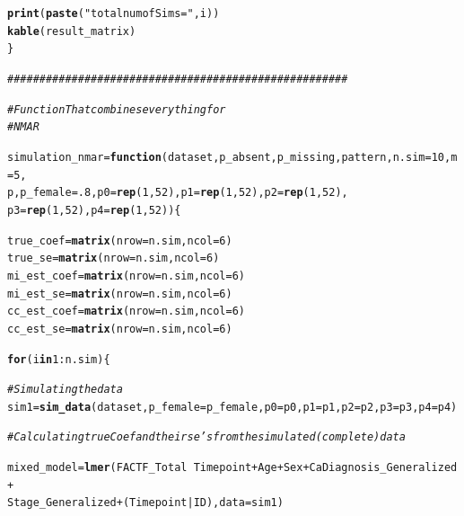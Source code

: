 \documentclass[fleqn,10pt]{wlscirep}\usepackage[]{graphicx}\usepackage[]{color}
\makeatletter
\newcommand{\hlnum}[1]{\textcolor[rgb]{0.686,0.059,0.569}{#1}}%
\newcommand{\hlstr}[1]{\textcolor[rgb]{0.192,0.494,0.8}{#1}}%
\newcommand{\hlcom}[1]{\textcolor[rgb]{0.678,0.584,0.686}{\textit{#1}}}%
\newcommand{\hlopt}[1]{\textcolor[rgb]{0,0,0}{#1}}%
\newcommand{\hlstd}[1]{\textcolor[rgb]{0.345,0.345,0.345}{#1}}%
\newcommand{\hlkwa}[1]{\textcolor[rgb]{0.161,0.373,0.58}{\textbf{#1}}}%
\newcommand{\hlkwb}[1]{\textcolor[rgb]{0.69,0.353,0.396}{#1}}%
\newcommand{\hlkwc}[1]{\textcolor[rgb]{0.333,0.667,0.333}{#1}}%
\newcommand{\hlkwd}[1]{\textcolor[rgb]{0.737,0.353,0.396}{\textbf{#1}}}%
\newenvironment{kframe}{%
 \def\at@end@of@kframe{}%
 \ifinner\ifhmode%
  \def\at@end@of@kframe{\end{minipage}}%
  \begin{minipage}{\columnwidth}%
 \fi\fi%
 \def\FrameCommand##1{\hskip\@totalleftmargin \hskip-\fboxsep
 \colorbox{shadecolor}{##1}\hskip-\fboxsep
     \hskip-\linewidth \hskip-\@totalleftmargin \hskip\columnwidth}%
 \MakeFramed {\advance\hsize-\width
   \@totalleftmargin\z@ \linewidth\hsize
   \@setminipage}}%
 {\par\unskip\endMakeFramed%
 \at@end@of@kframe}
\newenvironment{knitrout}{}{} %
\makeatother
\begin{document}
\begin{knitrout}
\begin{kframe}
\begin{alltt}
  \hlkwd{print}\hlstd{(}\hlkwd{paste}\hlstd{(}\hlstr{"total num of Sims = "}\hlstd{, i))}
  \hlkwd{kable}\hlstd{(result_matrix)}
\hlstd{\}}

\hlcom{#####################################################}

\hlcom{# Function That combines everything for}
\hlcom{# NMAR }

\hlstd{simulation_nmar} \hlkwb{=} \hlkwa{function}\hlstd{(}\hlkwc{dataset}\hlstd{,} \hlkwc{p_absent}\hlstd{,} \hlkwc{p_missing}\hlstd{,} \hlkwc{pattern}\hlstd{,} \hlkwc{n.sim} \hlstd{=} \hlnum{10}\hlstd{,} \hlkwc{m} \hlstd{=} \hlnum{5} \hlstd{,}
                           \hlkwc{p}\hlstd{,} \hlkwc{p_female}\hlstd{=}\hlnum{.8}\hlstd{,} \hlkwc{p0}\hlstd{=}\hlkwd{rep}\hlstd{(}\hlnum{1}\hlstd{,}\hlnum{52}\hlstd{),} \hlkwc{p1}\hlstd{=}\hlkwd{rep}\hlstd{(}\hlnum{1}\hlstd{,}\hlnum{52}\hlstd{),} \hlkwc{p2}\hlstd{=}\hlkwd{rep}\hlstd{(}\hlnum{1}\hlstd{,}\hlnum{52}\hlstd{),}
                           \hlkwc{p3}\hlstd{=}\hlkwd{rep}\hlstd{(}\hlnum{1}\hlstd{,}\hlnum{52}\hlstd{),} \hlkwc{p4}\hlstd{=}\hlkwd{rep}\hlstd{(}\hlnum{1}\hlstd{,}\hlnum{52}\hlstd{))\{}

  \hlstd{true_coef} \hlkwb{=} \hlkwd{matrix}\hlstd{(}\hlkwc{nrow} \hlstd{= n.sim,} \hlkwc{ncol} \hlstd{=} \hlnum{6}\hlstd{)}
  \hlstd{true_se} \hlkwb{=} \hlkwd{matrix}\hlstd{(}\hlkwc{nrow} \hlstd{= n.sim,} \hlkwc{ncol} \hlstd{=} \hlnum{6}\hlstd{)}
  \hlstd{mi_est_coef} \hlkwb{=} \hlkwd{matrix}\hlstd{(}\hlkwc{nrow} \hlstd{= n.sim,} \hlkwc{ncol} \hlstd{=} \hlnum{6}\hlstd{)}
  \hlstd{mi_est_se} \hlkwb{=} \hlkwd{matrix}\hlstd{(}\hlkwc{nrow} \hlstd{= n.sim,} \hlkwc{ncol} \hlstd{=} \hlnum{6}\hlstd{)}
  \hlstd{cc_est_coef} \hlkwb{=} \hlkwd{matrix}\hlstd{(}\hlkwc{nrow} \hlstd{= n.sim,} \hlkwc{ncol} \hlstd{=} \hlnum{6}\hlstd{)}
  \hlstd{cc_est_se} \hlkwb{=} \hlkwd{matrix}\hlstd{(}\hlkwc{nrow} \hlstd{= n.sim,} \hlkwc{ncol} \hlstd{=} \hlnum{6}\hlstd{)}

  \hlkwa{for} \hlstd{(i} \hlkwa{in} \hlnum{1}\hlopt{:}\hlstd{n.sim)\{}

    \hlcom{# Simulating the data }
    \hlstd{sim1} \hlkwb{=} \hlkwd{sim_data}\hlstd{(dataset,} \hlkwc{p_female} \hlstd{= p_female,} \hlkwc{p0}\hlstd{=p0,} \hlkwc{p1}\hlstd{=p1,} \hlkwc{p2}\hlstd{=p2,} \hlkwc{p3}\hlstd{=p3,} \hlkwc{p4}\hlstd{=p4)}

    \hlcom{# Calculating true Coef and their se's from the simulated (complete) data}

    \hlstd{mixed_model} \hlkwb{=} \hlkwd{lmer}\hlstd{(FACTF_Total} \hlopt{~} \hlstd{Timepoint} \hlopt{+} \hlstd{Age} \hlopt{+} \hlstd{Sex} \hlopt{+} \hlstd{CaDiagnosis_Generalized} \hlopt{+}
                         \hlstd{Stage_Generalized} \hlopt{+} \hlstd{(Timepoint}\hlopt{|}\hlstd{ID),} \hlkwc{data} \hlstd{= sim1)}


\end{alltt}
\end{kframe}
\end{knitrout}
\end{document}
